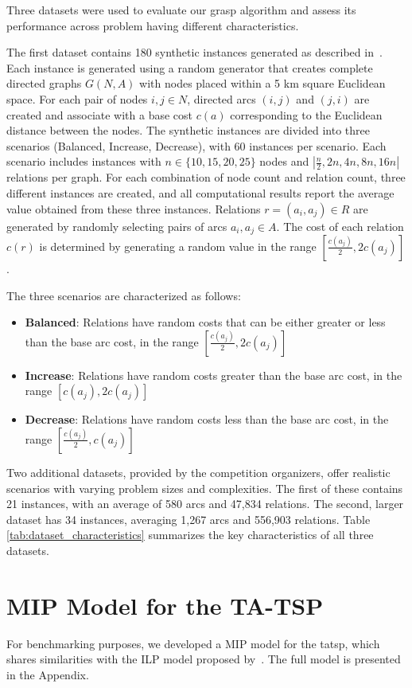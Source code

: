 \documentclass[twocolumn, switch]{article} %
\begin{document}
Three datasets were used to evaluate our \gls{grasp} algorithm and assess its performance across problem having different characteristics.

The first dataset contains 180 synthetic instances generated as described in~\citet{Cerrone}.
Each instance is generated using a random generator that creates complete directed graphs $G(N,A)$ 
with nodes placed within a 5 km square Euclidean space. 
For each pair of nodes $i, j \in N$, directed arcs $(i, j)$ and $(j, i)$ are created and associate with a base cost $c(a)$ 
corresponding to the Euclidean distance between the nodes. The synthetic instances are divided into three scenarios 
(Balanced, Increase, Decrease), with 60 instances per scenario. Each scenario includes instances with $n \in \{10, 15, 20, 25\}$ 
nodes and $|\frac{n}{2}, 2n, 4n, 8n, 16n|$ relations per graph. For each combination of node count and relation count, three 
different instances are created, and all computational results report the average value obtained from these three instances.
Relations $r = (a_i, a_j) \in R$ are generated by randomly selecting pairs of arcs $a_i, a_j \in A$. The cost of each relation $c(r)$ 
is determined by generating a random value in the range $[\frac{c(a_j)}{2}, 2c(a_j)]$.


The three scenarios are characterized as follows:
\begin{itemize}
    \item \textbf{Balanced}: Relations have random costs that can be either greater or less than the base arc cost, in the range $[\frac{c(a_j)}{2}, 2c(a_j)]$
    \item \textbf{Increase}: Relations have random costs greater than the base arc cost, in the range $[c(a_j), 2c(a_j)]$
    \item \textbf{Decrease}: Relations have random costs less than the base arc cost, in the range $[\frac{c(a_j)}{2}, c(a_j)]$
\end{itemize}

Two additional datasets, provided by the competition organizers, offer realistic scenarios with varying problem sizes and complexities. The first of these contains 21 instances, with an average of 580 arcs and 47,834 relations. The second, larger dataset has 34 instances, averaging 1,267 arcs and 556,903 relations. Table \ref{tab:dataset_characteristics} summarizes the key characteristics of all three datasets.



\appendix
\section{MIP Model for the TA-TSP}
\label{sec:mip_model}
For benchmarking purposes, we developed a MIP model for the \gls{tatsp}, which shares similarities with the ILP model proposed by~\citet{Cerrone}.
The full model is presented in the Appendix.
\end{document}
